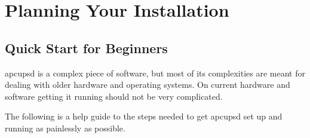 \label{index-User_0027s-Guide-4}

\label{Planning-Your-Installation}
\section*{Planning Your Installation}

\label{index-Planning-Installation-5}
\label{index-Installation_002c-Planning-6}

\label{Quick-Start-for-Beginners}

\subsection*{Quick Start for Beginners}

\label{index-Quick-Start-7}
apcupsd is a complex piece of software, but most of its complexities are meant
for dealing with older hardware and operating systems.  On current hardware
and software getting it running should not be very complicated.  

The following is a help guide to the steps needed to get apcupsd set up and
running as painlessly as possible.  

